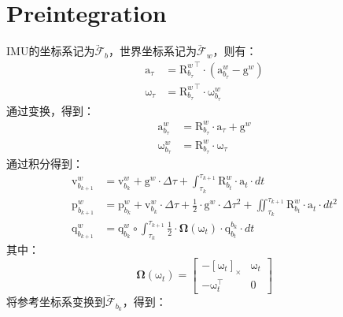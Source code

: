 \documentclass[12pt, onecolumn]{article}
\newcommand\normf{\fangsong}
\newcommand\liehat[1]{\left[ #1 \right]_\times}
\newcommand\bsm[1]{\boldsymbol{\mathrm{#1}}}
\newcommand\rotation[2]{{\bsm{R}_{#1}^{#2}}}
\newcommand\quaternion[2]{{\bsm{q}_{#1}^{#2}}}
\newcommand\angvel[2]{{\bsm{\omega}_{#1}^{#2}}}
\newcommand\translation[2]{{\bsm{p}_{#1}^{#2}}}
\newcommand\linvel[2]{{\bsm{v}_{#1}^{#2}}}
\newcommand\linacce[2]{{\bsm{a}_{#1}^{#2}}}
\newcommand\gravity[1]{{\bsm{g}^{#1}}}
\newcommand\coordframe[1]{\underrightarrow{\mathcal{F}}_{#1}}
\begin{document}
	\section{\normf Preintegration}
	\normf
	IMU的坐标系记为$\coordframe{b}$，世界坐标系记为$\coordframe{w}$，则有：
	\begin{equation}
	\begin{aligned}
	\bsm{a}_\tau&=\rotation{b_\tau}{w} ^\top\cdot\left(
	\linacce{b_\tau}{w}-\gravity{w}
	\right) 
	\\
	\bsm{\omega}_\tau&=\rotation{b_\tau}{w} ^\top\cdot\angvel{b_\tau}{w}
	\end{aligned}
	\end{equation}
	通过变换，得到：
	\begin{equation}
	\begin{aligned}
	\linacce{b_\tau}{w}&=\rotation{b_\tau}{w} \cdot \bsm{a}_\tau+\gravity{w}
	\\
	\angvel{b_\tau}{w}&=\rotation{b_\tau}{w}\cdot\bsm{\omega}_\tau
	\end{aligned}
	\end{equation}
	通过积分得到：
	\begin{equation}
	\begin{aligned}
		\linvel{b_{k+1}}{w}&=\linvel{b_{k}}{w}+\gravity{w}\cdot\Delta\tau
		+\int_{\tau_{k}}^{\tau_{k+1}}
		\rotation{b_t}{w} \cdot \bsm{a}_t \cdot dt
		\\
		\translation{b_{k+1}}{w}&=\translation{b_{k}}{w}
		+\linvel{b_{k}}{w}\cdot\Delta\tau
		+\frac{1}{2}\cdot\gravity{w}\cdot\Delta\tau^2+\iint_{\tau_{k}}^{\tau_{k+1}}
		\rotation{b_t}{w} \cdot \bsm{a}_t \cdot dt^2
		\\
		\quaternion{b_{k+1}}{w}&=\quaternion{b_k}{w}\circ
		 \int_{\tau_{k}}^{\tau_{k+1}}\frac{1}{2}\cdot\boldsymbol{\Omega}(\bsm{\omega}_t)\cdot\quaternion{b_t}{b_k}\cdot dt
	\end{aligned}
	\end{equation}
	其中：
	\begin{equation}
	\boldsymbol{\Omega}(\bsm{\omega}_t)=\begin{bmatrix}
	-\liehat{\bsm{\omega}_t} & \bsm{\omega}_t\\
	-\bsm{\omega}_t^\top & 0
	\end{bmatrix}
	\end{equation}
	将参考坐标系变换到$\coordframe{b_k}$，得到：
\end{document}

